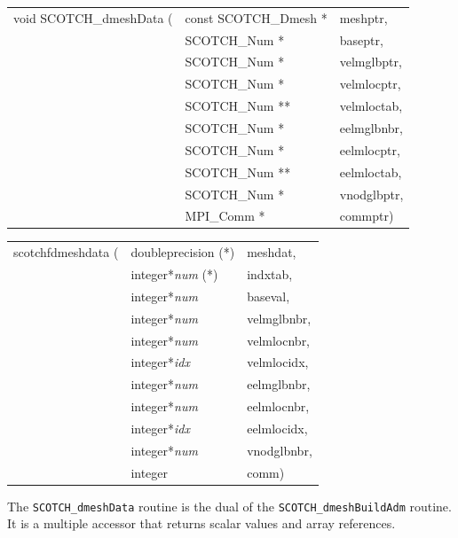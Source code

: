 \begin{itemize}
\progsyn

{\tt\begin{tabular}{l@{}ll}
void SCOTCH\_dmeshData ( & const SCOTCH\_Dmesh * & meshptr,    \\
                         & SCOTCH\_Num *         & baseptr,    \\
                         & SCOTCH\_Num *         & velmglbptr, \\
                         & SCOTCH\_Num *         & velmlocptr, \\
                         & SCOTCH\_Num **        & velmloctab, \\
                         & SCOTCH\_Num *         & eelmglbnbr, \\
                         & SCOTCH\_Num *         & eelmlocptr, \\
                         & SCOTCH\_Num **        & eelmloctab, \\
                         & SCOTCH\_Num *         & vnodglbptr, \\
                         & MPI\_Comm *           & commptr)
\end{tabular}}

{\tt\begin{tabular}{l@{}ll}
scotchfdmeshdata ( & doubleprecision (*)   & meshdat,    \\
                   & integer*{\it num} (*) & indxtab,    \\
                   & integer*{\it num}     & baseval,    \\
                   & integer*{\it num}     & velmglbnbr, \\
                   & integer*{\it num}     & velmlocnbr, \\
                   & integer*{\it idx}     & velmlocidx, \\
                   & integer*{\it num}     & eelmglbnbr, \\
                   & integer*{\it num}     & eelmlocnbr, \\
                   & integer*{\it idx}     & eelmlocidx, \\
                   & integer*{\it num}     & vnodglbnbr, \\
                   & integer               & comm)
\end{tabular}}

\progdes

The \texttt{SCOTCH\_dmeshData} routine is the dual of the
\texttt{SCOTCH\_\lbt dmesh\lbo Build\lbo Adm} routine. It is a
multiple accessor that returns scalar values and array references.


\end{itemize}
